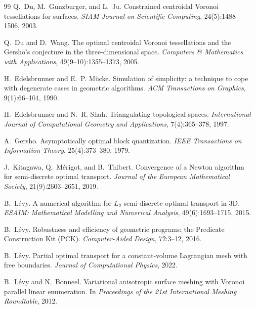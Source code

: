 \documentclass[11pt,a4paper]{article}
\begin{document}
\begin{thebibliography}{99}
Q.~Du, M.~Gunzburger, and L.~Ju.
\newblock Constrained centroidal {V}oronoi tessellations for surfaces.
\newblock \emph{SIAM Journal on Scientific Computing}, 24(5):1488--1506, 2003.

Q.~Du and D.~Wang.
\newblock The optimal centroidal {V}oronoi tessellations and the {G}ersho's conjecture in the
  three-dimensional space.
\newblock \emph{Computers \& Mathematics with Applications}, 49(9--10):1355--1373, 2005.

H.~Edelsbrunner and E.~P. M{\"u}cke.
\newblock Simulation of simplicity: a technique to cope with degenerate cases in geometric
  algorithms.
\newblock \emph{ACM Transactions on Graphics}, 9(1):66--104, 1990.

H.~Edelsbrunner and N.~R. Shah.
\newblock Triangulating topological spaces.
\newblock \emph{International Journal of Computational Geometry and Applications},
  7(4):365--378, 1997.

A.~Gersho.
\newblock Asymptotically optimal block quantization.
\newblock \emph{IEEE Transactions on Information Theory}, 25(4):373--380, 1979.

J.~Kitagawa, Q.~Mérigot, and B.~Thibert.
\newblock Convergence of a {N}ewton algorithm for semi-discrete optimal transport.
\newblock \emph{Journal of the European Mathematical Society}, 21(9):2603--2651, 2019.

B.~Lévy.
\newblock A numerical algorithm for {$L_2$} semi-discrete optimal transport in 3{D}.
\newblock \emph{ESAIM: Mathematical Modelling and Numerical Analysis}, 49(6):1693--1715, 2015.

B.~Lévy.
\newblock Robustness and efficiency of geometric programs: the {P}redicate {C}onstruction {K}it
  ({PCK}).
\newblock \emph{Computer-Aided Design}, 72:3--12, 2016.

B.~Lévy.
\newblock Partial optimal transport for a constant-volume {L}agrangian mesh with free
  boundaries.
\newblock \emph{Journal of Computational Physics}, 2022.

B.~Lévy and N.~Bonneel.
\newblock Variational anisotropic surface meshing with {V}oronoi parallel linear enumeration.
\newblock In \emph{Proceedings of the 21st International Meshing Roundtable}, 2012.


\end{thebibliography}
\end{document}

